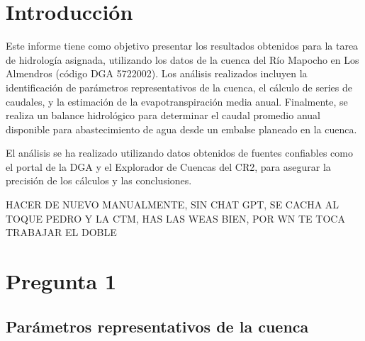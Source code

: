 \documentclass{article} %
\begin{document}
\newpage
\tableofcontents
\thispagestyle{plain} %
\thispagestyle{empty} %
\newpage

\setcounter{page}{1} %

\section{Introducción}

Este informe tiene como objetivo presentar los resultados obtenidos para la tarea de hidrología asignada, utilizando los datos de la cuenca del Río Mapocho en Los Almendros (código DGA 5722002). Los análisis realizados incluyen la identificación de parámetros representativos de la cuenca, el cálculo de series de caudales, y la estimación de la evapotranspiración media anual. Finalmente, se realiza un balance hidrológico para determinar el caudal promedio anual disponible para abastecimiento de agua desde un embalse planeado en la cuenca.

El análisis se ha realizado utilizando datos obtenidos de fuentes confiables como el portal de la DGA y el Explorador de Cuencas del CR2, para asegurar la precisión de los cálculos y las conclusiones.

HACER DE NUEVO MANUALMENTE, SIN CHAT GPT, SE CACHA AL TOQUE PEDRO Y LA CTM, HAS LAS WEAS BIEN, POR WN TE TOCA TRABAJAR EL DOBLE
\newpage
\section{Pregunta 1}

\subsection{Parámetros representativos de la cuenca}
\end{document}
